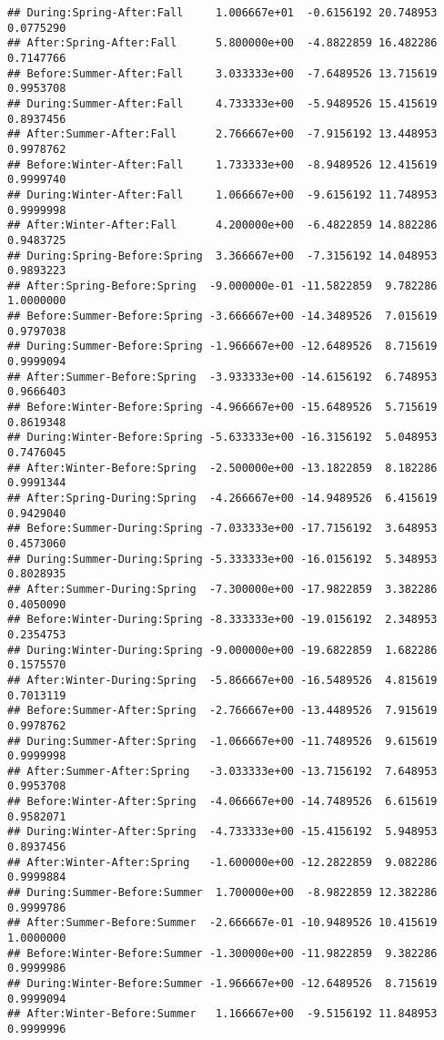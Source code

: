 \documentclass[
]{article}
\begin{document}
\begin{verbatim}
## During:Spring-After:Fall     1.006667e+01  -0.6156192 20.748953 0.0775290
## After:Spring-After:Fall      5.800000e+00  -4.8822859 16.482286 0.7147766
## Before:Summer-After:Fall     3.033333e+00  -7.6489526 13.715619 0.9953708
## During:Summer-After:Fall     4.733333e+00  -5.9489526 15.415619 0.8937456
## After:Summer-After:Fall      2.766667e+00  -7.9156192 13.448953 0.9978762
## Before:Winter-After:Fall     1.733333e+00  -8.9489526 12.415619 0.9999740
## During:Winter-After:Fall     1.066667e+00  -9.6156192 11.748953 0.9999998
## After:Winter-After:Fall      4.200000e+00  -6.4822859 14.882286 0.9483725
## During:Spring-Before:Spring  3.366667e+00  -7.3156192 14.048953 0.9893223
## After:Spring-Before:Spring  -9.000000e-01 -11.5822859  9.782286 1.0000000
## Before:Summer-Before:Spring -3.666667e+00 -14.3489526  7.015619 0.9797038
## During:Summer-Before:Spring -1.966667e+00 -12.6489526  8.715619 0.9999094
## After:Summer-Before:Spring  -3.933333e+00 -14.6156192  6.748953 0.9666403
## Before:Winter-Before:Spring -4.966667e+00 -15.6489526  5.715619 0.8619348
## During:Winter-Before:Spring -5.633333e+00 -16.3156192  5.048953 0.7476045
## After:Winter-Before:Spring  -2.500000e+00 -13.1822859  8.182286 0.9991344
## After:Spring-During:Spring  -4.266667e+00 -14.9489526  6.415619 0.9429040
## Before:Summer-During:Spring -7.033333e+00 -17.7156192  3.648953 0.4573060
## During:Summer-During:Spring -5.333333e+00 -16.0156192  5.348953 0.8028935
## After:Summer-During:Spring  -7.300000e+00 -17.9822859  3.382286 0.4050090
## Before:Winter-During:Spring -8.333333e+00 -19.0156192  2.348953 0.2354753
## During:Winter-During:Spring -9.000000e+00 -19.6822859  1.682286 0.1575570
## After:Winter-During:Spring  -5.866667e+00 -16.5489526  4.815619 0.7013119
## Before:Summer-After:Spring  -2.766667e+00 -13.4489526  7.915619 0.9978762
## During:Summer-After:Spring  -1.066667e+00 -11.7489526  9.615619 0.9999998
## After:Summer-After:Spring   -3.033333e+00 -13.7156192  7.648953 0.9953708
## Before:Winter-After:Spring  -4.066667e+00 -14.7489526  6.615619 0.9582071
## During:Winter-After:Spring  -4.733333e+00 -15.4156192  5.948953 0.8937456
## After:Winter-After:Spring   -1.600000e+00 -12.2822859  9.082286 0.9999884
## During:Summer-Before:Summer  1.700000e+00  -8.9822859 12.382286 0.9999786
## After:Summer-Before:Summer  -2.666667e-01 -10.9489526 10.415619 1.0000000
## Before:Winter-Before:Summer -1.300000e+00 -11.9822859  9.382286 0.9999986
## During:Winter-Before:Summer -1.966667e+00 -12.6489526  8.715619 0.9999094
## After:Winter-Before:Summer   1.166667e+00  -9.5156192 11.848953 0.9999996

\end{verbatim}
\end{document}

